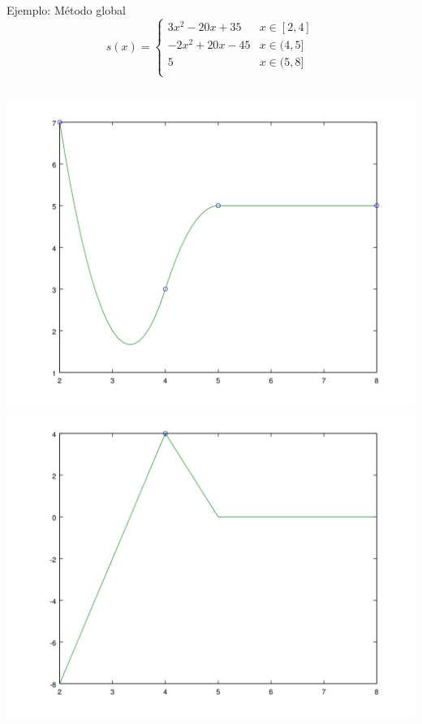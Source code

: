 \documentclass[compress]{beamer}
\theoremstyle{definition}
\begin{document}
\begin{frame}{Ejemplo: Método global}
\[
s(x) =
\begin{cases}
 3x^2 - 20x + 35  & x \in [2,4] \\
-2x^2 + 20x - 45 & x \in (4,5] \\
 5  & x \in (5,8] \\
\end{cases}
\]

\vfill

\begin{columns}
\includegraphics[width=\textwidth]{EjemploGlobal.png}
\includegraphics[width=\textwidth]{EjemploGlobalDer.png}
\end{columns}

\end{frame}
\end{document}
